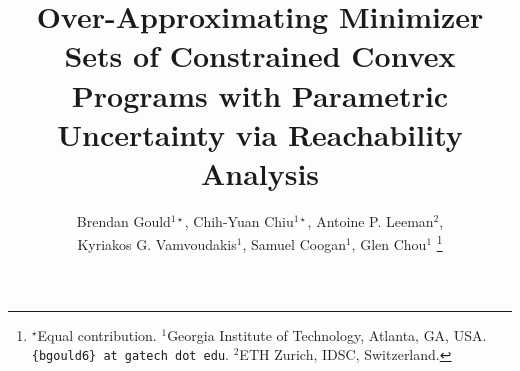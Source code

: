 \documentclass[letterpaper, 10 pt, conference]{ieeeconf}
\newcommand{\?}{\stackrel{?}{=}}
\newcommand{\INCOMPLETE}{\textcolor[rgb]{1,0,0}{\textbf{INCOMPLETE}}}
\begin{document}
\title{\LARGE \bf
Over-Approximating Minimizer Sets of Constrained Convex Programs with Parametric Uncertainty via Reachability Analysis
}

\author{
Brendan Gould$^{1\star}$,
Chih-Yuan Chiu$^{1\star}$, Antoine P. Leeman$^{2}$, \\ Kyriakos G. Vamvoudakis$^1$, Samuel Coogan$^1$, Glen Chou$^1$
\thanks{$^\star$Equal contribution. $^{1}$Georgia Institute of Technology, Atlanta, GA, USA. \texttt{\{bgould6\} at gatech dot edu}. $^{2}$ETH Zurich, IDSC, Switzerland. }
}

\maketitle

\thispagestyle{empty}
\pagestyle{empty}




\end{document}
